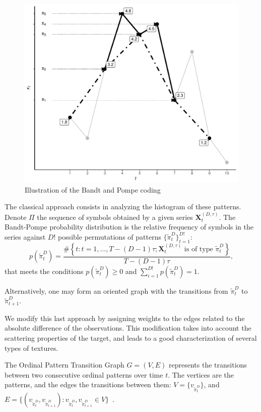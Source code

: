 \documentclass[paper=letter, fontsize=12pt]{article}
\begin{document}
\begin{figure}[hbt]
	\centering
	\includegraphics[width=.8\linewidth]{Figures/IntroBP}
	\caption{Illustration of the Bandt and Pompe coding\label{Fig:IntroBP}}
\end{figure}

The classical approach consists in analyzing the histogram of these patterns.
Denote $\Pi$ the sequence of symbols obtained by a given series $\mathbf{X}_t^{(D,\tau)}$.
The Bandt-Pompe probability distribution is the relative frequency of symbols in the series against $D!$ possible permutations of patterns $\{\widetilde\pi_t^D \}_{t = 1}^{D!}$:
\begin{equation}
p(\widetilde\pi_t^D) = \frac{\#\left \{t : t = 1, \dots, T-(D-1)\tau; \mathbf{X}_t^{(D,\tau)} \text{ is of type } \widetilde\pi_t^D\right \}}{T- (D-1)\tau},  
\end{equation}
that meets the conditions $p(\widetilde\pi_t^D) \ge 0$ and  $\sum_{i=1}^{D!} p(\widetilde\pi_t^D) = 1$.

Alternatively, one may form an oriented graph with the transitions from $\widetilde\pi_t^D$ to $\widetilde\pi_{t+1}^D$.

We modify this last approach by assigning weights to the edges related to the absolute difference of the observations.
This modification takes into account the scattering properties of the target, and leads to a good characterization of several types of textures.

The Ordinal Pattern Transition Graph ${G} = ({V}, {E})$ 
represents the transitions between two consecutive ordinal patterns over time $t$.
The vertices are the patterns, and the edges the transitions between them:
$V = \{v_{\widetilde\pi_t^D}\}$, and 
$E = \{(v_{\widetilde\pi_t^D}, v_{\widetilde\pi_{t+1}^D}): v_{\widetilde\pi_t^D}, v_{\widetilde\pi_{t+1}^D} \in V \}$~\cite{LearningandDistinguishingTimeSeriesDynamicsViaOrdinalPatternsTransitionGraphs2019}.
\end{document}
